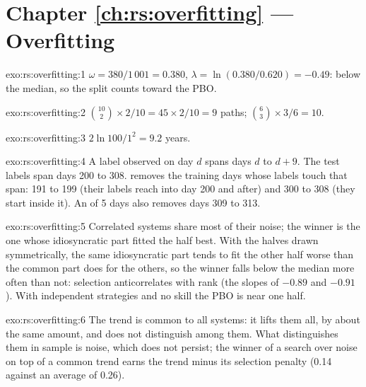 \section*{Chapter \ref{ch:rs:overfitting} --- Overfitting}

\begin{solution}{exo:rs:overfitting:1}
$\omega = 380/1\,001 = 0.380$, $\lambda = \ln(0.380/0.620) = -0.49$: below the median, so the split counts toward the PBO.
\end{solution}

\begin{solution}{exo:rs:overfitting:2}
$\binom{10}{2}\times 2/10 = 45 \times 2/10 = 9$ paths; $\binom{6}{3} \times 3/6 = 10$.
\end{solution}

\begin{solution}{exo:rs:overfitting:3}
$2\ln 100/1^2 = 9.2$ years.
\end{solution}

\begin{solution}{exo:rs:overfitting:4}
A label observed on day $d$ spans days $d$ to $d + 9$. The test labels span days 200 to 308.  removes the training days whose labels touch that span:
191 to 199 (their labels reach into day 200 and after) and 300 to 308 (they start inside it). An  of 5 days also removes days 309 to 313.
\end{solution}

\begin{solution}{exo:rs:overfitting:5}
Correlated systems share most of their noise; the  winner is the one whose idiosyncratic part fitted the  half best. With the halves
drawn symmetrically, the same idiosyncratic part tends to fit the other half worse than the common part does for the others, so the winner falls below
the median more often than not: selection anticorrelates with  rank (the slopes of $-0.89$ and $-0.91$). With independent strategies and no
skill the PBO is near one half.
\end{solution}

\begin{solution}{exo:rs:overfitting:6}
The trend is common to all systems: it lifts them all, by about the same amount, and does not distinguish among them. What distinguishes them in sample is
noise, which does not persist; the winner of a search over noise on top of a common trend earns the trend minus its selection penalty (0.14 against an
average of 0.26).
\end{solution}

